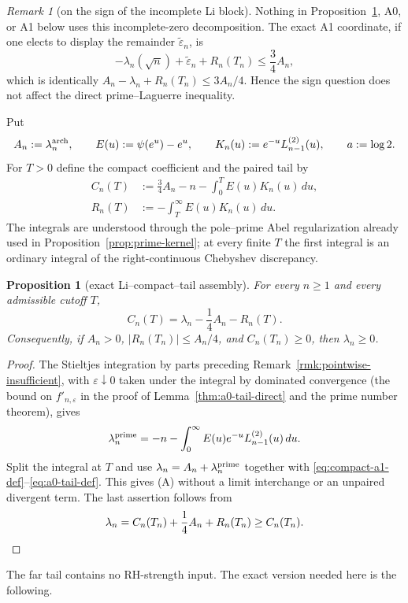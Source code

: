 \documentclass[11pt]{amsart}
\newtheorem{proposition}[theorem]{Proposition}
\theoremstyle{definition}
\theoremstyle{remark}
\newtheorem{remark}[theorem]{Remark}
\theoremstyle{definition}
\begin{document}
\begin{remark}[on the sign of the incomplete Li block]
Nothing in Proposition~\ref{prop:li-compact-tail}, A0, or A1 below uses this incomplete-zero
decomposition.  The exact A1 coordinate, if one elects to display the remainder $\widetilde\varepsilon_n$, is
\[
 -\lambda_n(\sqrt n)+\widetilde\varepsilon_n+R_n(T_n)
 \le\frac34A_n,
\]
which is identically $A_n-\lambda_n+R_n(T_n)\le3A_n/4$.  Hence the sign question does not
affect the direct prime--Laguerre inequality.
\end{remark}

Put
\[
 A_n:=\lambda_n^{\rm arch},\qquad
 E(u):=\psi(e^u)-e^u,\qquad
 K_n(u):=e^{-u}L_{n-1}^{(2)}(u),
 \qquad a:=\log2.
\]
For $T>0$ define the compact coefficient and the paired tail by
\begin{align}
 C_n(T)&:=\frac34A_n-n-\int_0^T E(u)K_n(u)\,du, \label{eq:compact-a1-def}\\
 R_n(T)&:=-\int_T^\infty E(u)K_n(u)\,du.       \label{eq:a0-tail-def}
\end{align}
The integrals are understood through the pole--prime Abel regularization already used in
Proposition~\ref{prop:prime-kernel}; at every finite $T$ the first integral is an ordinary integral of
the right-continuous Chebyshev discrepancy.

\begin{proposition}[exact Li--compact--tail assembly]\label{prop:li-compact-tail}
For every $n\ge1$ and every admissible cutoff $T$,
\[
 \boxed{\quad C_n(T)=\lambda_n-\frac14A_n-R_n(T).\quad}       \tag{A}
\]
Consequently, if $A_n>0$, $|R_n(T_n)|\le A_n/4$, and $C_n(T_n)\ge0$, then
$\lambda_n\ge0$.
\end{proposition}

\begin{proof}
The Stieltjes integration by parts preceding Remark~\ref{rmk:pointwise-insufficient}, with
$\varepsilon\downarrow0$ taken under the integral by dominated convergence (the bound on
$f'_{n,\varepsilon}$ in the proof of Lemma~\ref{thm:a0-tail-direct} and the prime number theorem),
gives
\[
 \lambda_n^{\rm prime}
 =-n-\int_0^\infty E(u)e^{-u}L_{n-1}^{(2)}(u)\,du.
\]
Split the integral at $T$ and use
$\lambda_n=A_n+\lambda_n^{\rm prime}$ together with
\eqref{eq:compact-a1-def}--\eqref{eq:a0-tail-def}.  This gives (A) without a
limit interchange or an unpaired divergent term.  The last assertion follows from
\[
 \lambda_n=C_n(T_n)+\frac14A_n+R_n(T_n)
 \ge C_n(T_n).\qedhere
\]
\end{proof}

The far tail contains no RH-strength input.  The exact version needed here is the following.
\end{document}

